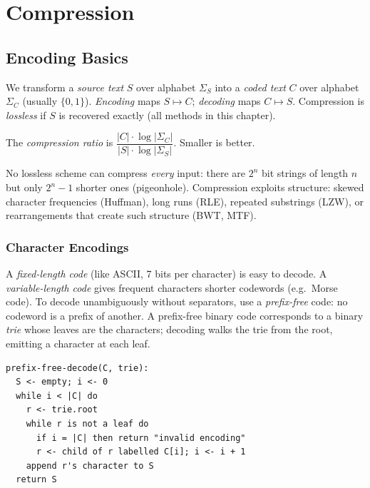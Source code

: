 \chapter{Compression}

\section{Encoding Basics}

\begin{definition}
We transform a \emph{source text} $S$ over alphabet $\Sigma_S$ into a \emph{coded
text} $C$ over alphabet $\Sigma_C$ (usually $\{0,1\}$). \emph{Encoding} maps
$S \mapsto C$; \emph{decoding} maps $C \mapsto S$. Compression is
\emph{lossless} if $S$ is recovered exactly (all methods in this chapter).
\end{definition}

\begin{definition}
The \emph{compression ratio} is $\dfrac{|C| \cdot \log|\Sigma_C|}{|S| \cdot
\log|\Sigma_S|}$. Smaller is better.
\end{definition}

No lossless scheme can compress \emph{every} input: there are $2^n$ bit strings
of length $n$ but only $2^n - 1$ shorter ones (pigeonhole). Compression exploits
structure: skewed character frequencies (Huffman), long runs (RLE), repeated
substrings (LZW), or rearrangements that create such structure (BWT, MTF).

\subsection{Character Encodings}
A \emph{fixed-length code} (like ASCII, 7 bits per character) is easy to decode.
A \emph{variable-length code} gives frequent characters shorter codewords
(e.g.\ Morse code). To decode unambiguously without separators, use a
\emph{prefix-free} code: no codeword is a prefix of another. A prefix-free
binary code corresponds to a binary \emph{trie} whose leaves are the characters;
decoding walks the trie from the root, emitting a character at each leaf.

\begin{lstlisting}
prefix-free-decode(C, trie):
  S <- empty; i <- 0
  while i < |C| do
    r <- trie.root
    while r is not a leaf do
      if i = |C| then return "invalid encoding"
      r <- child of r labelled C[i]; i <- i + 1
    append r's character to S
  return S
\end{lstlisting}

